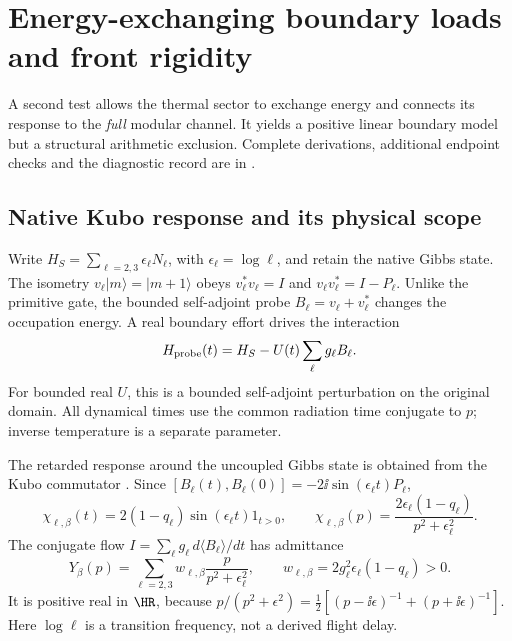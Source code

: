 \section{Energy-exchanging boundary loads and front rigidity}
\label{sec:thermal_boundary}

A second test allows the thermal sector to exchange energy and connects
its response to the \emph{full} modular channel. It yields a positive
linear boundary model but a structural arithmetic exclusion. Complete
derivations, additional endpoint checks and the diagnostic record are
in \cite{BoundaryNote}.

\subsection{Native Kubo response and its physical scope}

Write $H_S=\sum_{\ell=2,3}\epsilon_\ell N_\ell$, with
$\epsilon_\ell=\log\ell$, and retain the native Gibbs state. The
isometry $v_\ell|m\rangle=|m+1\rangle$ obeys
$v_\ell^*v_\ell=I$ and $v_\ell v_\ell^*=I-P_\ell$.
Unlike the primitive gate, the bounded self-adjoint probe
$B_\ell=v_\ell+v_\ell^*$ changes the occupation energy. A real
boundary effort drives the interaction
\begin{equation}
 H_{\rm probe}(t)=H_S-U(t)\sum_\ell g_\ell B_\ell.
\end{equation}
For bounded real $U$, this is a bounded self-adjoint perturbation on
the original domain. All dynamical times use the common radiation time
conjugate to $p$; inverse temperature is a separate parameter.

The retarded response around the uncoupled Gibbs state is obtained
from the Kubo commutator \cite{Kubo}. Since
$[B_\ell(t),B_\ell(0)]=-2\ii\sin(\epsilon_\ell t)P_\ell$,
\begin{equation}
 \chi_{\ell,\beta}(t)=2(1-q_\ell)\sin(\epsilon_\ell t)1_{t>0},
 \qquad
 \chi_{\ell,\beta}(p)=\frac{2\epsilon_\ell(1-q_\ell)}
 {p^2+\epsilon_\ell^2}.
 \label{eq:native_kubo}
\end{equation}
The conjugate flow $I=\sum_\ell g_\ell\,d\langle B_\ell\rangle/dt$
has admittance
\begin{equation}
 Y_\beta(p)=\sum_{\ell=2,3}w_{\ell,\beta}
 \frac{p}{p^2+\epsilon_\ell^2},\qquad
 w_{\ell,\beta}=2g_\ell^2\epsilon_\ell(1-q_\ell)>0.
 \label{eq:native_admittance}
\end{equation}
It is positive real in $\HR$, because
$p/(p^2+\epsilon^2)=\tfrac12[(p-\ii\epsilon)^{-1}+
(p+\ii\epsilon)^{-1}]$. Here $\log\ell$ is a transition frequency,
not a derived flight delay.


